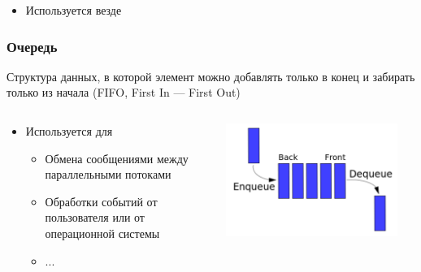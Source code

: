 \documentclass[xetex,mathserif,serif]{beamer}
\begin{document}
\begin{frame}
\begin{columns}
\begin{column}{0.45\textwidth}
\begin{center}
					\end{center}
				\end{column}
		\end{columns}
		\begin{itemize}
		\item Используется везде
			\begin{itemize}
			\end{itemize}
		\end{itemize}
	\end{frame}

	\begin{frame}
		\frametitle{Очередь}
		Структура данных, в которой элемент можно добавлять только в конец и забирать только из начала (FIFO, First In --- First Out)
		\begin{columns}
			\begin{column}{0.6\textwidth}
				\begin{itemize}
					\item Используется для
					\begin{itemize}
						\item Обмена сообщениями между параллельными потоками
						\item Обработки событий от пользователя или от операционной системы
						\item ...
					\end{itemize}
				\end{itemize}
			\end{column}
			\begin{column}{0.4\textwidth}
				\begin{center}
					\includegraphics[width=0.9\textwidth]{queue.png}
				\end{center}
			\end{column}
		\end{columns}
	\end{frame}
\end{document}
